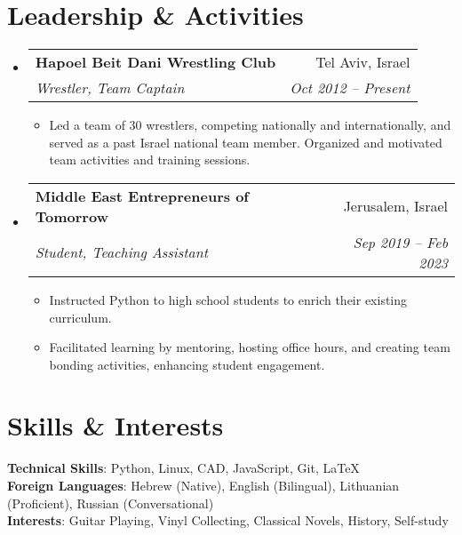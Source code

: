 \documentclass[letterpaper,11pt]{article}
\makeatletter
\newcommand{\resumeItem}[1]{
  \item\small{
    {#1 \vspace{-2pt}}
  }
}
\newcommand{\resumeSubheading}[4]{
  \vspace{-4pt}\item
    \begin{tabular*}{1\textwidth}[t]{l@{\extracolsep{\fill}}r}
      \textbf{#1} & #2 \\
      \textit{\small#3} & \textit{\small #4} \\
    \end{tabular*}\vspace{-7pt}
}
\newcommand{\resumeSubHeadingListStart}{\begin{itemize}[leftmargin=0.0in, label={}]}
\newcommand{\resumeSubHeadingListEnd}{\end{itemize}}
\newcommand{\resumeItemListStart}{\begin{itemize}}
\newcommand{\resumeItemListEnd}{\end{itemize}\vspace{-5pt}}
\makeatother
\begin{document}
\section{Leadership \& Activities}
  \resumeSubHeadingListStart
    \resumeSubheading
      {Hapoel Beit Dani Wrestling Club}{Tel Aviv, Israel}
      {Wrestler, Team Captain}{Oct 2012 -- Present}
      \resumeItemListStart
        \resumeItem{}
          {Led a team of 30 wrestlers, competing nationally and internationally, and served as a past Israel national team member. Organized and motivated team activities and training sessions.}
      \resumeItemListEnd
      
    \resumeSubheading
      {Middle East Entrepreneurs of Tomorrow}{Jerusalem, Israel}
      {Student, Teaching Assistant}{Sep 2019 -- Feb 2023}
      \resumeItemListStart
        \resumeItem{}
          {Instructed Python to high school students to enrich their existing curriculum.}
        \resumeItem{}
          {Facilitated learning by mentoring, hosting office hours, and creating team bonding activities, enhancing student engagement.}
      \resumeItemListEnd
  \resumeSubHeadingListEnd


\section{Skills \& Interests}
 \begin{itemize}[leftmargin=0.15in, label={}]
    \small{\item{
     \textbf{Technical Skills}{: Python, Linux, CAD, JavaScript, Git, LaTeX} \\
     \textbf{Foreign Languages}{: Hebrew (Native), English (Bilingual), Lithuanian (Proficient), Russian (Conversational)} \\
     \textbf{Interests}{: Guitar Playing, Vinyl Collecting, Classical Novels, History, Self-study}
    }}
 \end{itemize}
 
\end{document}
